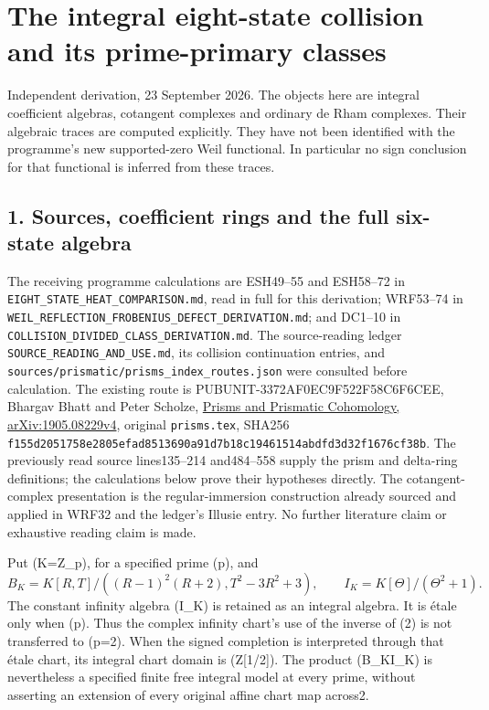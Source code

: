 \documentclass[
  10pt,
]{article}
\author{}
\date{}
\begin{document}
\section{The integral eight-state collision and its prime-primary
classes}\label{the-integral-eight-state-collision-and-its-prime-primary-classes}

Independent derivation, 23 September 2026. The objects here are integral
coefficient algebras, cotangent complexes and ordinary de Rham
complexes. Their algebraic traces are computed explicitly. They have not
been identified with the programme's new supported-zero Weil functional.
In particular no sign conclusion for that functional is inferred from
these traces.

\subsection{1. Sources, coefficient rings and the full six-state
algebra}\label{sources-coefficient-rings-and-the-full-six-state-algebra}

The receiving programme calculations are ESH49--55 and ESH58--72 in
\texttt{EIGHT\_STATE\_HEAT\_COMPARISON.md}, read in full for this
derivation; WRF53--74 in
\texttt{WEIL\_REFLECTION\_FROBENIUS\_DEFECT\_DERIVATION.md}; and DC1--10
in \texttt{COLLISION\_DIVIDED\_CLASS\_DERIVATION.md}. The source-reading
ledger \texttt{SOURCE\_READING\_AND\_USE.md}, its collision continuation
entries, and \texttt{sources/prismatic/prisms\_index\_routes.json} were
consulted before calculation. The existing route is
PUBUNIT-3372AF0EC9F522F58C6F6CEE, Bhargav Bhatt and Peter Scholze,
\href{https://arxiv.org/abs/1905.08229v4}{Prisms and Prismatic
Cohomology, arXiv:1905.08229v4}, original \texttt{prisms.tex}, SHA256
\texttt{f155d2051758e2805efad8513690a91d7b18c19461514abdfd3d32f1676cf38b}.
The previously read source lines135--214 and484--558 supply the prism
and delta-ring definitions; the calculations below prove their
hypotheses directly. The cotangent-complex presentation is the
regular-immersion construction already sourced and applied in WRF32 and
the ledger's Illusie entry. No further literature claim or exhaustive
reading claim is made.

Put (K=\mathbb Z\_p), for a specified prime (p), and \[
B_K=K[R,T]/((R-1)^2(R+2),T^2-3R^2+3),\qquad
I_K=K[\Theta]/(\Theta^2+1).
\tag{IEC1}
\] The constant infinity algebra (I\_K) is retained as an integral
algebra. It is étale only when (p). Thus the complex infinity
chart's use of the inverse of (2\Theta) is not transferred to (p=2).
When the signed completion is interpreted through that étale chart, its
integral chart domain is (\mathbb Z{[}1/2{]}). The product
(B\_K\times I\_K) is nevertheless a specified finite free integral model
at every prime, without asserting an extension of every original affine
chart map across2.
\end{document}
